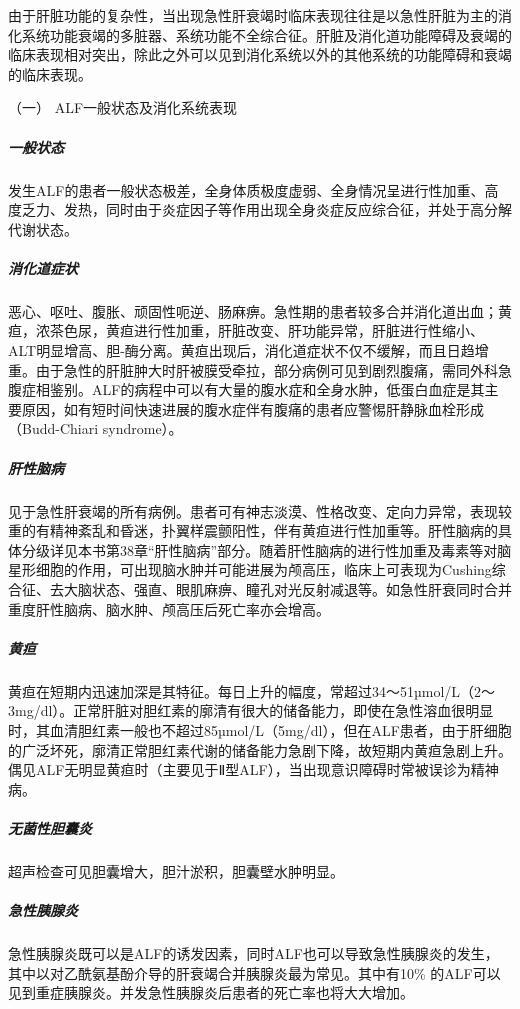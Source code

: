 由于肝脏功能的复杂性，当出现急性肝衰竭时临床表现往往是以急性肝脏为主的消化系统功能衰竭的多脏器、系统功能不全综合征。肝脏及消化道功能障碍及衰竭的临床表现相对突出，除此之外可以见到消化系统以外的其他系统的功能障碍和衰竭的临床表现。

\hypertarget{text00082.htmlux5cux23CHP3-6-2-2-1-1}{}
（一） ALF一般状态及消化系统表现

\subparagraph{一般状态}

发生ALF的患者一般状态极差，全身体质极度虚弱、全身情况呈进行性加重、高度乏力、发热，同时由于炎症因子等作用出现全身炎症反应综合征，并处于高分解代谢状态。

\subparagraph{消化道症状}

恶心、呕吐、腹胀、顽固性呃逆、肠麻痹。急性期的患者较多合并消化道出血；黄疸，浓茶色尿，黄疸进行性加重，肝脏改变、肝功能异常，肝脏进行性缩小、ALT明显增高、胆-酶分离。黄疸出现后，消化道症状不仅不缓解，而且日趋增重。由于急性的肝脏肿大时肝被膜受牵拉，部分病例可见到剧烈腹痛，需同外科急腹症相鉴别。ALF的病程中可以有大量的腹水症和全身水肿，低蛋白血症是其主要原因，如有短时间快速进展的腹水症伴有腹痛的患者应警惕肝静脉血栓形成（Budd-Chiari
syndrome）。

\subparagraph{肝性脑病}

见于急性肝衰竭的所有病例。患者可有神志淡漠、性格改变、定向力异常，表现较重的有精神紊乱和昏迷，扑翼样震颤阳性，伴有黄疸进行性加重等。肝性脑病的具体分级详见本书第38章“肝性脑病”部分。随着肝性脑病的进行性加重及毒素等对脑星形细胞的作用，可出现脑水肿并可能进展为颅高压，临床上可表现为Cushing综合征、去大脑状态、强直、眼肌麻痹、瞳孔对光反射减退等。如急性肝衰同时合并重度肝性脑病、脑水肿、颅高压后死亡率亦会增高。

\subparagraph{黄疸}

黄疸在短期内迅速加深是其特征。每日上升的幅度，常超过34～51µmol/L（2～3mg/dl）。正常肝脏对胆红素的廓清有很大的储备能力，即使在急性溶血很明显时，其血清胆红素一般也不超过85µmol/L（5mg/dl），但在ALF患者，由于肝细胞的广泛坏死，廓清正常胆红素代谢的储备能力急剧下降，故短期内黄疸急剧上升。偶见ALF无明显黄疸时（主要见于Ⅱ型ALF），当出现意识障碍时常被误诊为精神病。

\subparagraph{无菌性胆囊炎}

超声检查可见胆囊增大，胆汁淤积，胆囊壁水肿明显。

\subparagraph{急性胰腺炎}

急性胰腺炎既可以是ALF的诱发因素，同时ALF也可以导致急性胰腺炎的发生，其中以对乙酰氨基酚介导的肝衰竭合并胰腺炎最为常见。其中有10\%
的ALF可以见到重症胰腺炎。并发急性胰腺炎后患者的死亡率也将大大增加。


